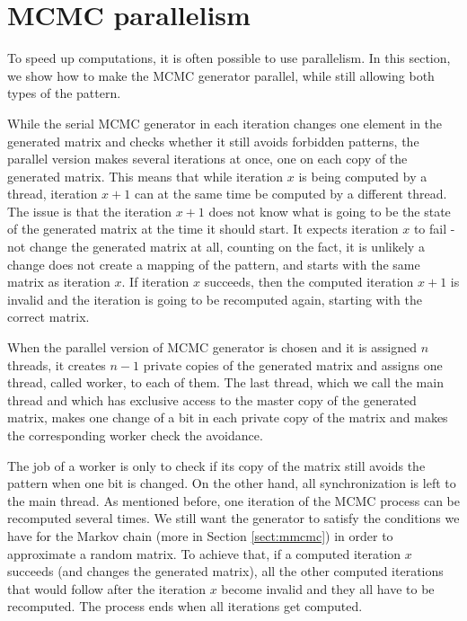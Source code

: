 \section{MCMC parallelism}
\label{sect:parallel}
To speed up computations, it is often possible to use parallelism. In this section, we show how to make the MCMC generator parallel, while still allowing both types of the pattern.

While the serial MCMC generator in each iteration changes one element in the generated matrix and checks whether it still avoids forbidden patterns, the parallel version makes several iterations at once, one on each copy of the generated matrix. This means that while iteration $x$ is being computed by a thread, iteration $x+1$ can at the same time be computed by a different thread. The issue is that the iteration $x+1$ does not know what is going to be the state of the generated matrix at the time it should start. It expects iteration $x$ to fail - not change the generated matrix at all, counting on the fact, it is unlikely a change does not create a mapping of the pattern, and starts with the same matrix as iteration $x$. If iteration $x$ succeeds, then the computed iteration $x+1$ is invalid and the iteration is going to be recomputed again, starting with the correct matrix.

When the parallel version of MCMC generator is chosen and it is assigned $n$ threads, it creates $n-1$ private copies of the generated matrix and assigns one thread, called worker, to each of them. The last thread, which we call the main thread and which has exclusive access to the master copy of the generated matrix, makes one change of a bit in each private copy of the matrix and makes the corresponding worker check the avoidance.

The job of a worker is only to check if its copy of the matrix still avoids the pattern when one bit is changed. On the other hand, all synchronization is left to the main thread. As mentioned before, one iteration of the MCMC process can be recomputed several times. We still want the generator to satisfy the conditions we have for the Markov chain (more in Section \ref{sect:mmcmc}) in order to approximate a random matrix. To achieve that, if a computed iteration $x$ succeeds (and changes the generated matrix), all the other computed iterations that would follow after the iteration $x$ become invalid and they all have to be recomputed. The process ends when all iterations get computed.

